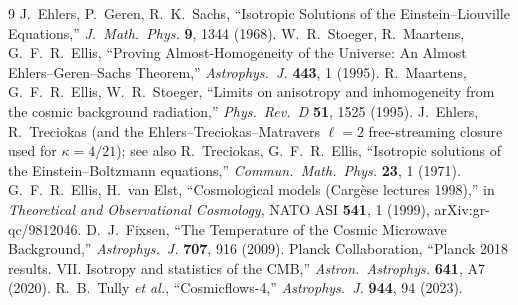 \documentclass[11pt,a4paper]{article}
\theoremstyle{plain}
\theoremstyle{definition}
\begin{document}
\begin{thebibliography}{9}
\small
{} J.~Ehlers, P.~Geren, R.~K.~Sachs,
  ``Isotropic Solutions of the Einstein--Liouville Equations,''
  \emph{J.\ Math.\ Phys.} \textbf{9}, 1344 (1968).
 W.~R.~Stoeger, R.~Maartens, G.~F.~R.~Ellis,
  ``Proving Almost-Homogeneity of the Universe: An Almost
  Ehlers--Geren--Sachs Theorem,'' \emph{Astrophys.\ J.}
  \textbf{443}, 1 (1995).
 R.~Maartens, G.~F.~R.~Ellis, W.~R.~Stoeger,
  ``Limits on anisotropy and inhomogeneity from the cosmic
  background radiation,'' \emph{Phys.\ Rev.\ D} \textbf{51}, 1525
  (1995).
 J.~Ehlers, R.~Treciokas (and the
  Ehlers--Treciokas--Matravers $\ell=2$ free-streaming closure used
  for $\kappa=4/21$); see also R.~Treciokas, G.~F.~R.~Ellis,
  ``Isotropic solutions of the Einstein--Boltzmann equations,''
  \emph{Commun.\ Math.\ Phys.} \textbf{23}, 1 (1971).
 G.~F.~R.~Ellis, H.~van Elst,
  ``Cosmological models (Carg\`ese lectures 1998),'' in
  \emph{Theoretical and Observational Cosmology}, NATO ASI
  \textbf{541}, 1 (1999), arXiv:gr-qc/9812046.
 D.~J.~Fixsen,
  ``The Temperature of the Cosmic Microwave Background,''
  \emph{Astrophys.\ J.} \textbf{707}, 916 (2009).
 Planck Collaboration,
  ``Planck 2018 results. VII. Isotropy and statistics of the CMB,''
  \emph{Astron.\ Astrophys.} \textbf{641}, A7 (2020).
 R.~B.~Tully \emph{et al.},
  ``Cosmicflows-4,'' \emph{Astrophys.\ J.} \textbf{944}, 94 (2023).
\end{thebibliography}
\end{document}
